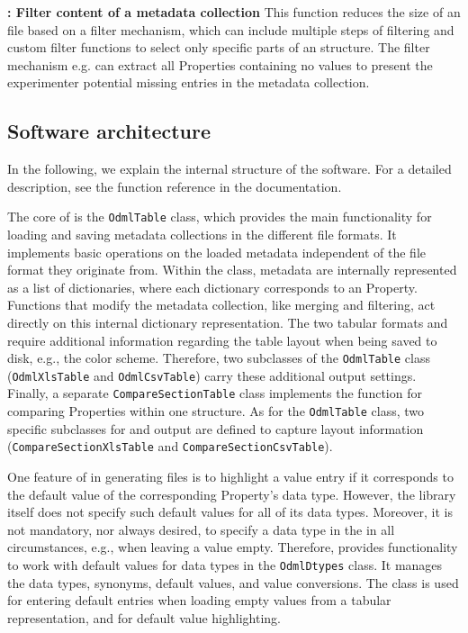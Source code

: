 \textbf{\ffilter: Filter content of a metadata collection} This function reduces the size of an  file based on a filter mechanism, which can include multiple steps of filtering and custom filter functions to select only specific parts of an  structure. The filter mechanism e.g. can extract all Properties containing no values to present the experimenter potential missing entries in the metadata collection.


\subsection{Software architecture}
\label{sub:Software-Architecture}

In the following, we explain the internal structure of the  software. For a detailed description, see the function reference in the  documentation.

The core of  is the \texttt{OdmlTable} class, which provides the main functionality for loading and saving metadata collections in the different file formats. It implements basic operations on the loaded metadata independent of the file format they originate from. Within the class, metadata are internally represented as a list of dictionaries, where each dictionary corresponds to an  Property. Functions that modify the metadata collection, like merging and filtering, act directly on this internal dictionary representation. The two tabular formats  and  require additional information regarding the table layout when being saved to disk, e.g., the color scheme. Therefore, two subclasses of the \texttt{OdmlTable} class (\texttt{OdmlXlsTable} and \texttt{OdmlCsvTable}) carry these additional output settings. Finally, a separate \texttt{CompareSectionTable} class implements the function for comparing Properties within one  structure. As for the \texttt{OdmlTable} class, two specific subclasses for  and  output are defined to capture layout information (\texttt{CompareSectionXlsTable} and \texttt{CompareSectionCsvTable}).

One feature of  in generating  files is to highlight a value entry if it corresponds to the default value of the corresponding Property's data type. However, the  library itself does not specify such default values for all of its data types. Moreover, it is not mandatory, nor always desired, to specify a data type in the  in all circumstances, e.g., when leaving a value empty. Therefore,  provides functionality to work with default values for data types in the \texttt{OdmlDtypes} class. It manages the data types, synonyms, default values, and value conversions. The class is used for entering default entries when loading empty values from a tabular representation, and for default value highlighting.

